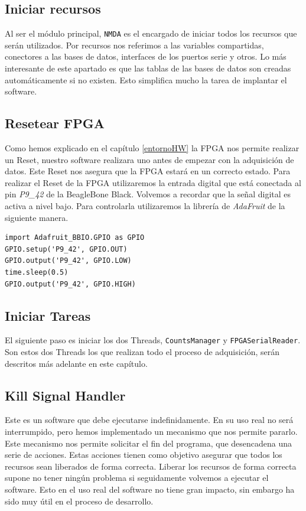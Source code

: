 	\subsection{Iniciar recursos}
		Al ser el módulo principal, \texttt{NMDA} es el encargado de iniciar todos los recursos que serán utilizados. Por recursos nos
		referimos a las variables compartidas, conectores a las bases de datos, interfaces de los puertos serie y otros. Lo más interesante de
		este apartado es que las tablas de las bases de datos son creadas automáticamente si no existen. Esto simplifica mucho la tarea de
		implantar el software.
	\subsection{Resetear FPGA}
		Como hemos explicado en el capítulo \ref{entornoHW} la FPGA nos permite realizar un Reset, nuestro software realizara uno antes de
		empezar con la adquisición de datos. Este Reset nos asegura que la FPGA estará en un correcto estado. Para realizar el Reset de la
		FPGA utilizaremos la entrada digital que está conectada al pin \emph{P9\_42} de la BeagleBone Black. Volvemos a recordar que la señal
		digital es activa a nivel bajo. Para controlarla utilizaremos la librería de \emph{AdaFruit}\cite{AdaFruitGit} de la siguiente manera.
		\begin{lstlisting}
import Adafruit_BBIO.GPIO as GPIO
GPIO.setup('P9_42', GPIO.OUT)
GPIO.output('P9_42', GPIO.LOW)
time.sleep(0.5)
GPIO.output('P9_42', GPIO.HIGH)
		\end{lstlisting}
	\subsection{Iniciar Tareas}
		El siguiente paso es iniciar los dos Threads, \texttt{CountsManager} y \texttt{FPGASerialReader}. Son estos dos Threads los que
		realizan todo el proceso de adquisición, serán descritos más adelante en este capítulo. 
	\subsection{Kill Signal Handler}
		Este es un software que debe ejecutarse indefinidamente. En su uso real no será interrumpido, pero hemos implementado un mecanismo que
		nos permite pararlo. Este mecanismo nos permite solicitar el fin del programa, que desencadena una serie de acciones. Estas acciones
		tienen como objetivo asegurar que todos los recursos sean liberados de forma correcta. Liberar los recursos de forma correcta supone
		no tener ningún problema si seguidamente volvemos a ejecutar el software. Esto en el uso real del software no tiene gran impacto, sin
		embargo ha sido muy útil en el proceso de desarrollo.

